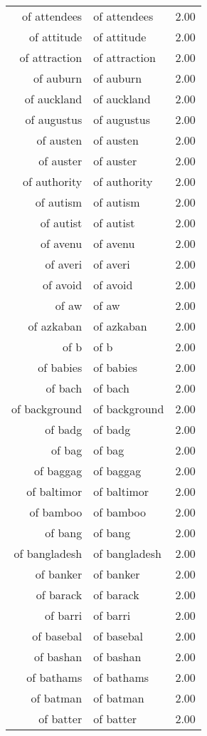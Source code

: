 \begin{table}[ht]
\begin{tabular}{rlr}
  of attendees & of attendees & 2.00 \\ 
  of attitude & of attitude & 2.00 \\ 
  of attraction & of attraction & 2.00 \\ 
  of auburn & of auburn & 2.00 \\ 
  of auckland & of auckland & 2.00 \\ 
  of augustus & of augustus & 2.00 \\ 
  of austen & of austen & 2.00 \\ 
  of auster & of auster & 2.00 \\ 
  of authority & of authority & 2.00 \\ 
  of autism & of autism & 2.00 \\ 
  of autist & of autist & 2.00 \\ 
  of avenu & of avenu & 2.00 \\ 
  of averi & of averi & 2.00 \\ 
  of avoid & of avoid & 2.00 \\ 
  of aw & of aw & 2.00 \\ 
  of azkaban & of azkaban & 2.00 \\ 
  of b & of b & 2.00 \\ 
  of babies & of babies & 2.00 \\ 
  of bach & of bach & 2.00 \\ 
  of background & of background & 2.00 \\ 
  of badg & of badg & 2.00 \\ 
  of bag & of bag & 2.00 \\ 
  of baggag & of baggag & 2.00 \\ 
  of baltimor & of baltimor & 2.00 \\ 
  of bamboo & of bamboo & 2.00 \\ 
  of bang & of bang & 2.00 \\ 
  of bangladesh & of bangladesh & 2.00 \\ 
  of banker & of banker & 2.00 \\ 
  of barack & of barack & 2.00 \\ 
  of barri & of barri & 2.00 \\ 
  of basebal & of basebal & 2.00 \\ 
  of bashan & of bashan & 2.00 \\ 
  of bathams & of bathams & 2.00 \\ 
  of batman & of batman & 2.00 \\ 
  of batter & of batter & 2.00 \\ 

\end{tabular}
\end{table}
